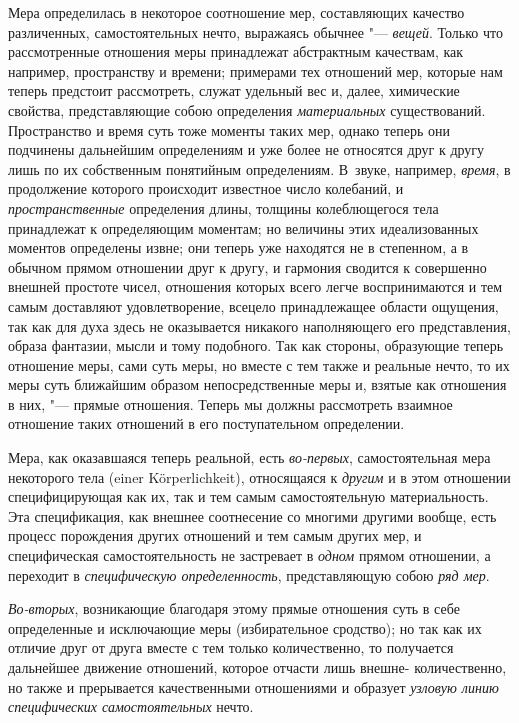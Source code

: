 
Мера определилась в некоторое соотношение мер,
составляющих качество различенных, самостоятельных нечто, выражаясь обычнее
"--- {\em вещей}. Только что рассмотренные отношения меры
принадлежат абстрактным качествам, как например, пространству и времени;
примерами тех отношений мер, которые нам теперь предстоит рассмотреть,
служат удельный вес и, далее, химические свойства, представляющие собою
определения {\em материальных} существований.
Пространство и время суть тоже моменты таких мер, однако теперь они
подчинены дальнейшим определениям и уже более не относятся друг к другу
лишь по их собственным понятийным определениям. В~звуке, например,
{\em время}, в продолжение которого происходит
известное число колебаний, и {\em пространственные}
определения длины, толщины колеблющегося тела принадлежат к определяющим
моментам; но величины этих идеализованных моментов определены извне; они
теперь уже находятся не в степенном, а в обычном прямом отношении друг к
другу, и гармония сводится к совершенно внешней простоте чисел, отношения
которых всего легче воспринимаются и тем самым доставляют удовлетворение,
всецело принадлежащее области ощущения, так как для духа здесь не
оказывается никакого наполняющего его представления, образа фантазии, мысли
и тому подобного. Так как стороны, образующие теперь отношение меры, сами
суть меры, но вместе с тем также и реальные нечто, то их меры суть
ближайшим образом непосредственные меры и, взятые как отношения в них, "---
прямые отношения. Теперь мы должны рассмотреть взаимное отношение таких
отношений в его поступательном определении.

Мера, как оказавшаяся теперь реальной, есть
{\em во-первых}, самостоятельная мера некоторого тела
(einer Körperlichkeit), относящаяся к {\em другим} и в
этом отношении специфицирующая как их, так и тем самым самостоятельную
материальность. Эта спецификация, как внешнее соотнесение со многими
другими вообще, есть процесс порождения других отношений и тем самым других
мер, и специфическая самостоятельность не застревает в
{\em одном} прямом отношении, а переходит в
{\em специфическую определенность}, представляющую собою {\em ряд мер}.

{\em Во-вторых}, возникающие благодаря этому прямые
отношения суть в себе определенные и исключающие меры (избирательное
сродство); но так как их отличие друг от друга вместе с тем только
количественно, то получается дальнейшее движение отношений, которое отчасти
лишь внешне- количественно, но также и прерывается качественными
отношениями и образует {\em узловую линию специфических самостоятельных} нечто.


